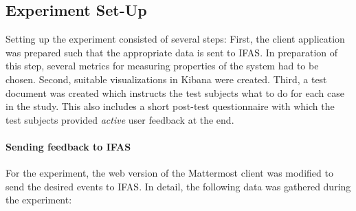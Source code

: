 \subsection{Experiment Set-Up}

Setting up the experiment consisted of several steps:
First, the client application was prepared such that the appropriate data is sent to \ac{IFAS}.
In preparation of this step, several metrics for measuring properties of the system had to be chosen.
Second, suitable visualizations in Kibana were created.
Third, a test document was created which instructs the test subjects what to do for each case in the study.
This also includes a short post-test questionnaire with which the test subjects provided \emph{active} user feedback at the end.

\paragraph{Sending feedback to IFAS}

For the experiment, the web version of the Mattermost client was modified to send the desired events to \ac{IFAS}.
In detail, the following data was gathered during the experiment:

